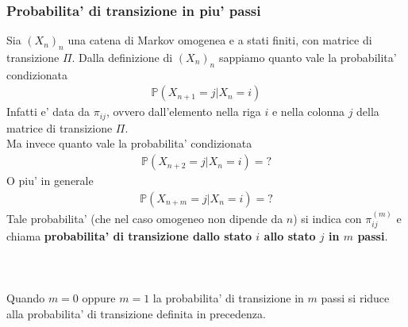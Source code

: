 \documentclass[a4paper,12pt]{article}
\begin{document}
\subsubsection{Probabilita' di transizione in piu' passi}
Sia $(X_n)_n$ una catena di Markov omogenea e a stati finiti, con matrice di transizione $\Pi$. Dalla definizione di $(X_n)_n$ sappiamo quanto vale la probabilita' condizionata
\begin{align*}
  \mathbb{P}(X_{n+1} = j | X_n = i)
\end{align*}
Infatti e' data da $\pi_{ij}$, ovvero dall'elemento nella riga $i$ e nella colonna $j$ della matrice di transizione $\Pi$.\\
Ma invece quanto vale la probabilita' condizionata
\begin{align*}
  \mathbb{P}(X_{n+2} = j | X_n = i) = ?
\end{align*}
O piu' in generale
\begin{align*}
  \mathbb{P}(X_{n+m} = j | X_n = i) = ?
\end{align*}
Tale probabilita' (che nel caso omogeneo non dipende da $n$) si indica con $\pi_{ij}^{(m)}$ e chiama \textbf{probabilita' di transizione dallo stato $i$ allo stato $j$ in $m$ passi}.\\
\vspace{1px}\\
\\
\vspace{1px}\\
Quando $m = 0$ oppure $m = 1$ la probabilita' di transizione in $m$ passi si riduce alla probabilita' di transizione definita in precedenza.\\
\vspace{1px}\\
\end{document}
